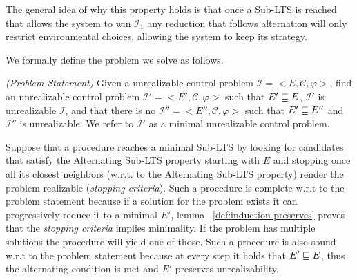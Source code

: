 The general idea of why this property holds is that once a Sub-LTS is reached that allows the system to win $\mathcal{I}_1$ any reduction that follows alternation will only restrict environmental choices, allowing the system to keep its strategy.


We formally define the problem we solve as follows.

\begin{definition}\label{def:ProblemStatement}\emph{(Problem Statement)}
Given a unrealizable control problem $\mathcal{I} = <E, \mathcal{C}, \varphi>$, find an unrealizable control problem $\mathcal{I'} = <E', \mathcal{C}, \varphi>$ such that $E' \sqsubseteq E$, $\mathcal{I'}$ is unrealizable $\mathcal{I}$, and that there is no $\mathcal{I''} = <E'', \mathcal{C}, \varphi>$ such that $E' \sqsubseteq E''$ and $\mathcal{I''}$ is unrealizable. We refer to $\mathcal{I'}$ as a minimal unrealizable control problem.
\end{definition}

Suppose that a procedure reaches a minimal Sub-LTS by looking for candidates that satisfy the Alternating Sub-LTS property starting with $E$ and stopping once all its closest neighbors (w.r.t. to the Alternating Sub-LTS property) render the problem realizable (\emph{stopping criteria}). Such a procedure is 
complete w.r.t to the problem statement because
if a solution for the problem exists it can progressively
reduce it to a minimal $E'$, lemma ~\ref{def:induction-preserves} proves that the \emph{stopping criteria}
implies minimality. If the problem has multiple solutions the procedure
will yield one of those.
Such a procedure is also sound w.r.t to the problem statement because
at every step it holds that $E' \sqsubseteq E$, thus the alternating condition
is met and $E'$ preserves unrealizability.
%
